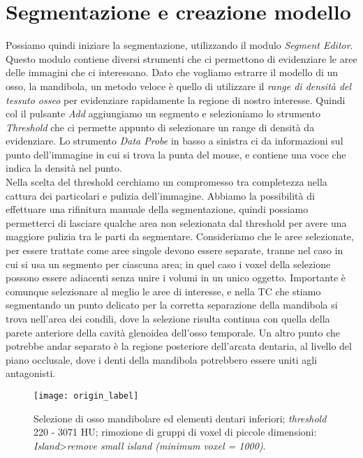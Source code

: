 \section{Segmentazione e creazione modello}
Possiamo quindi iniziare la segmentazione, utilizzando il modulo \emph{Segment Editor}. Questo modulo contiene diversi strumenti che ci permettono di evidenziare le aree delle immagini che ci interessano. Dato che vogliamo estrarre il modello di un osso, la mandibola, un metodo veloce è quello di utilizzare il \emph{range di densità del tessuto osseo} per evidenziare rapidamente la regione di nostro interesse. Quindi col il pulsante \emph{Add} aggiungiamo un segmento e selezioniamo lo strumento \emph{Threshold} che ci permette appunto di selezionare un range di densità da evidenziare. Lo strumento \emph{Data Probe} in basso a sinistra ci da informazioni sul punto dell'immagine in cui si trova la punta del mouse, e contiene una voce che indica la densità nel punto.\\
Nella scelta del threshold cerchiamo un compromesso tra completezza nella cattura dei particolari e pulizia dell'immagine. Abbiamo la possibilità di effettuare una rifinitura manuale della segmentazione, quindi possiamo permetterci di lasciare qualche area non selezionata dal threshold per avere una maggiore pulizia tra le parti da segmentare. Consideriamo che le aree selezionate, per essere trattate come aree singole devono essere separate, tranne nel caso in cui si usa un segmento per ciascuna area; in quel caso i voxel della selezione possono essere adiacenti senza unire i volumi in un unico oggetto.
Importante è comunque selezionare al meglio le aree di interesse, e nella TC che stiamo segmentando un punto delicato per la corretta separazione della mandibola si trova nell'area dei condili, dove la selezione risulta continua con quella della parete anteriore della cavità glenoidea dell'osso temporale. Un altro punto che potrebbe andar separato è la regione posteriore dell'arcata dentaria, al livello del piano occlusale, dove i denti della mandibola potrebbero essere uniti agli antagonisti.
\begin{figure}[h]
\centering
\texttt{[image: origin\_label]}
\caption{Selezione di osso mandibolare ed elementi dentari inferiori; \emph{threshold} 220 - 3071 HU; rimozione di gruppi di voxel di piccole dimensioni: \emph{Island}>\emph{remove small island (minimum voxel = 1000)}.}
\label{fig:origin_label}
\end{figure}
\\

